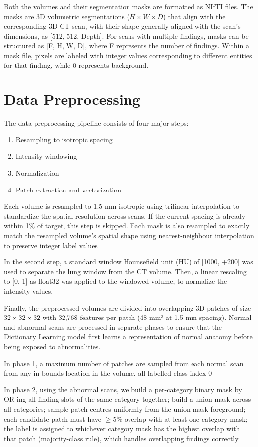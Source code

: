 Both the volumes and their segmentation masks are formatted as NIfTI files. The masks are 3D volumetric segmentations
(\(H \times W \times D\)) that align with the corresponding 3D CT scan, with their shape generally aligned with the scan's dimensions, as [512, 512, Depth].
For scans with multiple findings, masks can be structured as [F, H, W, D], where F represents the number of findings.
Within a mask file, pixels are labeled with integer values corresponding to different entities for that finding, while 0 represents background.

\section{Data Preprocessing}
The data preprocessing pipeline consists of four major steps:
\begin{enumerate}
    \item Resampling to isotropic spacing
    \item Intensity windowing
    \item Normalization
    \item Patch extraction and vectorization
\end{enumerate}

Each volume is resampled to 1.5 mm isotropic using trilinear interpolation to standardize the spatial resolution across scans.
If the current spacing is already within 1\% of target, this step is skipped.
Each mask is also resampled to exactly match the resampled volume's spatial shape using nearest-neighbour interpolation to preserve integer label values

In the second step, a standard window Hounsefield unit (HU) of [1000, +200] was used to separate the lung window from the CT volume.
Then, a linear rescaling to [0, 1] as float32 was applied to the windowed volume, to normalize the intensity values.

Finally, the preprocessed volumes are divided into overlapping 3D patches of size \(32 \times 32 \times 32\) with
32,768 features per patch (48 mm³ at 1.5 mm spacing).
Normal and abnormal scans are processed in separate phases to ensure that the Dictionary Learning model first learns a representation of normal anatomy before being exposed to abnormalities.

In phase 1, a maximum number of patches are sampled from each normal scan from any in-bounds location in the volume.
all labelled class index 0

In phase 2, using the abnormal scans, we build a per-category binary mask by OR-ing all finding slots of the same category together; build a
union mask across all categories; sample patch centres uniformly from the union mask foreground; each candidate patch must have
$ \geq 5\% $ overlap with at least one category mask; the label is assigned to whichever
category mask has the highest overlap with that patch (majority-class rule), which handles overlapping findings correctly

